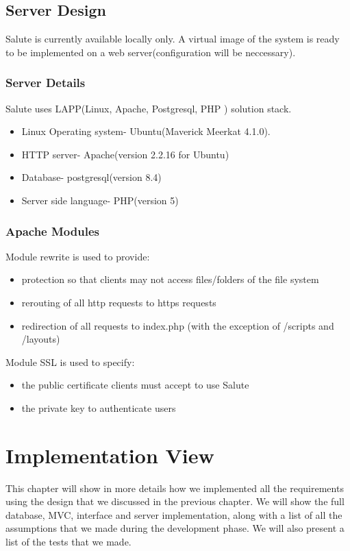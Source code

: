 \documentclass[12pt]{report}
\begin{document}
\section{Server Design}
Salute is currently available locally only. A virtual image of the system is ready to be implemented on a web server(configuration will be neccessary).

\subsection{Server Details}
Salute uses LAPP(Linux, Apache, Postgresql, PHP ) solution stack.
\begin{itemize}
\item Linux Operating system- Ubuntu(Maverick Meerkat 4.1.0). 
\item HTTP server- Apache(version 2.2.16 for Ubuntu)
\item Database- postgresql(version 8.4)
\item Server side language- PHP(version 5)
\end{itemize}

\subsection{Apache Modules}
Module rewrite is used to provide:
\begin{itemize}
\item protection so that clients may not access files/folders of the file system
\item rerouting of all http requests to https requests
\item redirection of all requests to index.php (with the exception of /scripts and /layouts)
\end{itemize}
Module SSL is used to specify:
\begin{itemize}
\item the public certificate clients must accept to use Salute
\item the private key to authenticate users
\end{itemize}

\chapter{Implementation View}
This chapter will show in more details how we implemented all the requirements using the design that we discussed in the previous chapter. We will show the full database, MVC, interface and server implementation, along with a list of all the assumptions that we made during the development phase. We will also present a list of the tests that we made.
\end{document}
